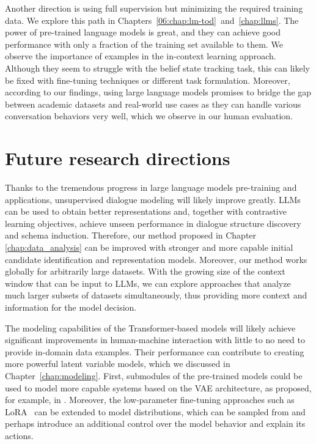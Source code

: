 Another direction is using full supervision but minimizing the required training data.
We explore this path in Chapters~\ref{06:chap:lm-tod}~and~\ref{chap:llms}.
The power of pre-trained language models is great, and they can achieve good performance with only a fraction of the training set available to them.
We observe the importance of examples in the in-context learning approach.
Although they seem to struggle with the belief state tracking task, this can likely be fixed with fine-tuning techniques or different task formulation.
Moreover, according to our findings, using large language models promises to bridge the gap between academic datasets and real-world use cases as they can handle various conversation behaviors very well, which we observe in our human evaluation.

\section{Future research directions}
Thanks to the tremendous progress in large language models pre-training and applications, unsupervised dialogue modeling will likely improve greatly.
LLMs can be used to obtain better representations and, together with contrastive learning objectives, achieve unseen performance in dialogue structure discovery and schema induction.
Therefore, our method proposed in Chapter \ref{chap:data_analysis} can be improved with stronger and more capable initial candidate identification and representation models.
Moreover, our method works globally for arbitrarily large datasets.
With the growing size of the context window that can be input to LLMs, we can explore approaches that analyze much larger subsets of datasets simultaneously, thus providing more context and information for the model decision.


The modeling capabilities of the Transformer-based models will likely achieve significant improvements in human-machine interaction with little to no need to provide in-domain data examples.
Their performance can contribute to creating more powerful latent variable models, which we discussed in Chapter~\ref{chap:modeling}.
First, submodules of the pre-trained models could be used to model more capable systems based on the VAE architecture, as proposed, for example, in \citet{li-etal-2020-optimus}.
Moreover, the low-parameter fine-tuning approaches such as LoRA~\citep{hu2021lora} can be extended to model distributions, which can be sampled from and perhaps introduce an additional control over the model behavior and explain its actions.

